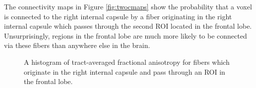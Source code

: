 The connectivity maps in Figure \ref{fig:twocmaps} show the probability that a voxel is connected to the right internal capsule by a fiber originating in the right internal capsule which passes through the second ROI located in the frontal lobe.  Unsurprisingly, regions in the frontal lobe are much more likely to be connected via these fibers than anywhere else in the brain.

\begin{figure} \label{fig:twoFAhistograms}
	\caption{A histogram of tract-averaged fractional anisotropy for fibers which originate in the right internal capsule and pass through an ROI in the frontal lobe.}
\end{figure}

